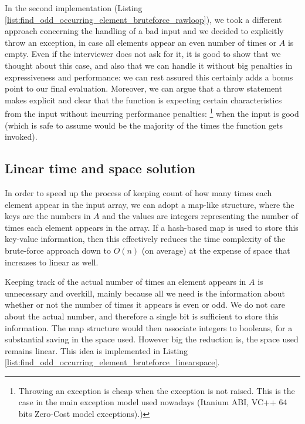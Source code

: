 In the second implementation (Listing \ref{list:find_odd_occurring_element_bruteforce_rawloop}), we took a different approach concerning the handling of a bad input and we decided to explicitly throw an exception, in case all elements appear an even number of times or $A$ is empty. 
Even if the interviewer does not ask for it, it is good to show that we thought about this case, and also that we can handle it without big penalties in expressiveness and performance: we can rest assured this certainly adds a bonus point to our final evaluation. 
Moreover, we can argue that a throw statement makes explicit and clear that the function is expecting certain characteristics from the input without incurring performance penalties: \footnote{Throwing an exception is cheap when the exception is not raised. This is the case in the main exception model used nowadays (Itanium ABI, VC++ 64 bits Zero-Cost model exceptions)\cite{cit:web:openstd_exception}.)} when the input is  good
(which is safe to assume would be the majority of the times the function gets invoked).

\subsection{Linear time and space solution}
\label{find_odd_occurring_element:sec:map}

In order to speed up the process of keeping count of how many times each element appear in the input array, we can adopt a map-like structure, where the keys are the numbers in $A$ and the values are integers representing the number of times each element appears in the array.
If a hash-based map is used to store this key-value information, then this effectively reduces the time complexity of the brute-force approach down to $O(n)$ (on average) at the expense of space that increases to linear as well.

Keeping track of the actual number of times an element appears in $A$ is unnecessary and overkill, mainly because all we need is the information about whether or not the number of times it appears is even or odd. We do not care about the actual number, and therefore a single bit is sufficient to store this information. The map structure would then associate integers to booleans, for a substantial saving in the space used. However big the reduction is, the space used remains linear. 
This idea is implemented in Listing \ref{list:find_odd_occurring_element_bruteforce_linearspace}.



